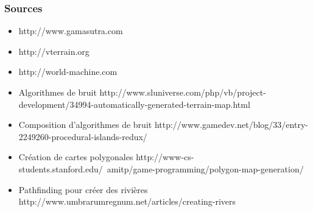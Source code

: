 \documentclass{beamer}
\begin{document}


\begin{frame}
  \frametitle{Sources}
  \begin{itemize}
  \item http://www.gamasutra.com
  \item http://vterrain.org
  \item http://world-machine.com
  \item Algorithmes de bruit {\tiny http://www.sluniverse.com/php/vb/project-development/34994-automatically-generated-terrain-map.html}
  \item Composition d'algorithmes de bruit {\tiny http://www.gamedev.net/blog/33/entry-2249260-procedural-islands-redux/}
  \item Création de cartes polygonales {\tiny http://www-cs-students.stanford.edu/~amitp/game-programming/polygon-map-generation/}
  \item Pathfinding pour créer des rivières {\tiny http://www.umbrarumregnum.net/articles/creating-rivers}
  \end{itemize}
\end{frame}
\end{document}
